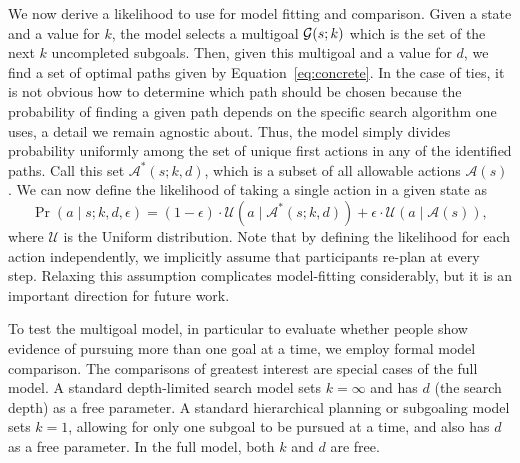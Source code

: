 \documentclass[10pt,letterpaper]{article}
\begin{document}
\newcommand{\A}{\mathcal{A}}
\newcommand{\U}{\mathcal{U}}

We now derive a likelihood to use for model fitting and comparison. Given a state and a value for $k$, the model selects a multigoal $\mathcal{G}(s; k)$ which is the set of the next $k$ uncompleted subgoals. Then, given this multigoal and a value for $d$, we find a set of optimal paths given by Equation~\ref{eq:concrete}. In the case of ties, it is not obvious how to determine which path should be chosen because the probability of finding a given path depends on the specific search algorithm one uses, a detail we remain agnostic about. Thus, the model simply divides probability uniformly among the set of unique first actions in any of the identified paths. Call this set $\A^*(s; k, d)$, which is a subset of all allowable actions $\A(s)$. We can now define the likelihood of taking a single action in a given state as
%
\begin{equation}\label{eq:likelihood-fixed}
  \Pr(a \mid s; k, d, \epsilon) = 
  (1 - \epsilon) \cdot \U(a \mid \A^*(s; k, d)) + 
  \epsilon \cdot \U(a \mid \A(s)),
\end{equation}
%
where $\U$ is the Uniform distribution. Note that by defining the likelihood for each action independently, we implicitly assume that participants re-plan at every step. Relaxing this assumption complicates model-fitting considerably, but it is an important direction for future work.

To test the multigoal model, in particular to evaluate whether people show evidence of pursuing more than one goal at a time, we employ formal model comparison. The comparisons of greatest interest are special cases of the full model. A standard depth-limited search model sets $k=\infty$ and has $d$ (the search depth) as a free parameter. A standard hierarchical planning or subgoaling model sets $k=1$, allowing for only one subgoal to be pursued at a time, and also has $d$ as a free parameter. In the full model, both $k$ and $d$ are free.
\end{document}
